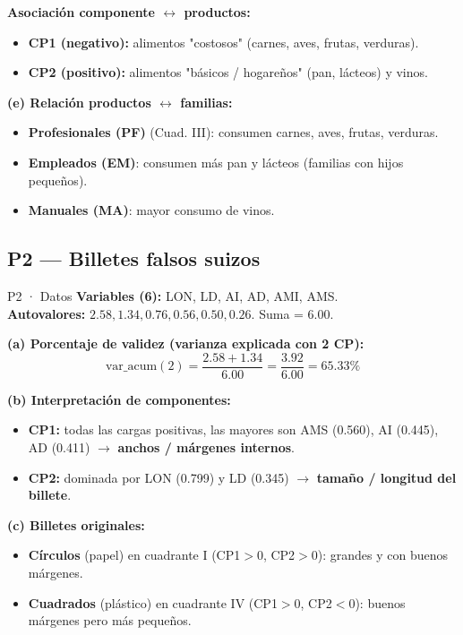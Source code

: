 \documentclass[11pt,a4paper]{article}
\begin{document}
\textbf{Asociación componente $\leftrightarrow$ productos:}
\begin{itemize}[leftmargin=*]
    \item \textbf{CP1 (negativo):} alimentos "costosos" (carnes, aves, frutas, verduras).
    \item \textbf{CP2 (positivo):} alimentos "básicos / hogareños" (pan, lácteos) y vinos.
\end{itemize}

\textbf{(e) Relación productos $\leftrightarrow$ familias:}
\begin{itemize}[leftmargin=*]
    \item \textbf{Profesionales (PF)} (Cuad. III): consumen carnes, aves, frutas, verduras.
    \item \textbf{Empleados (EM)}: consumen más pan y lácteos (familias con hijos pequeños).
    \item \textbf{Manuales (MA)}: mayor consumo de vinos.
\end{itemize}

\hrulefill

\subsection{P2 — Billetes falsos suizos}

\begin{ejerciciobox}{P2 · Datos}
\textbf{Variables (6):} LON, LD, AI, AD, AMI, AMS.\\
\textbf{Autovalores:} $2.58, 1.34, 0.76, 0.56, 0.50, 0.26$. Suma = $6.00$.
\end{ejerciciobox}

\textbf{(a) Porcentaje de validez (varianza explicada con 2 CP):}
\[
\mathrm{var\_acum}(2) = \frac{2.58+1.34}{6.00} = \frac{3.92}{6.00} = \boxed{65.33\%}
\]

\textbf{(b) Interpretación de componentes:}
\begin{itemize}[leftmargin=*]
    \item \textbf{CP1:} todas las cargas positivas, las mayores son AMS (0.560), AI (0.445), AD (0.411) $\to$ \textbf{anchos / márgenes internos}.
    \item \textbf{CP2:} dominada por LON (0.799) y LD (0.345) $\to$ \textbf{tamaño / longitud del billete}.
\end{itemize}

\textbf{(c) Billetes originales:}
\begin{itemize}[leftmargin=*]
    \item \textbf{Círculos} (papel) en cuadrante I (CP1$>$0, CP2$>$0): grandes y con buenos márgenes.
    \item \textbf{Cuadrados} (plástico) en cuadrante IV (CP1$>$0, CP2$<$0): buenos márgenes pero más pequeños.
\end{itemize}
\end{document}

